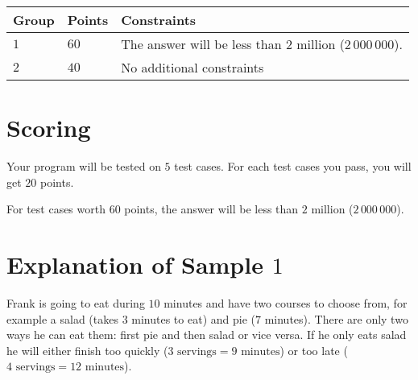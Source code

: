 \noindent
\begin{tabular}{| l | l | p{10cm} |}
\hline
Group & Points & Constraints \\ \hline
$1$    & $60$        & The answer will be less than $2$ million ($2\,000\,000$). \\ \hline 
$2$    & $40$        & No additional constraints \\ \hline
\end{tabular}

\section*{Scoring}
Your program will be tested on $5$ test cases.
For each test cases you pass, you will get $20$ points.

For test cases worth $60$ points, the answer will be less than $2$ million ($2\,000\,000$).

\section*{Explanation of Sample $1$}
Frank is going to eat during $10$ minutes and have two courses to choose from, for example a salad (takes $3$ minutes to eat) and pie ($7$ minutes).
There are only two ways he can eat them: first pie and then salad or vice versa.
If he only eats salad he will either finish too quickly ($3 \text{ servings} = 9 \text{ minutes}$) or too late ($4 \text{ servings} = 12 \text{ minutes}$).
